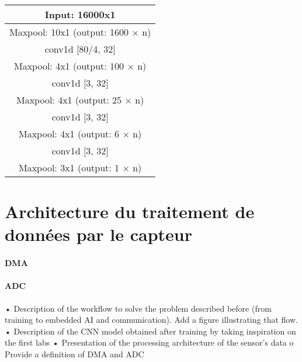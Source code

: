 \begin{center}
  \begin{tabular}{ |c|}
   \hline
    Input: 16000x1\\
   \hline
    Maxpool: 10x1 (output: 1600 × n)\\
   \hline
    conv1d [80/4, 32]\\
   \hline
    Maxpool: 4x1 (output: 100 × n)\\
   \hline
    conv1d [3, 32]\\
   \hline
    Maxpool: 4x1 (output: 25 × n)\\
   \hline
    conv1d [3, 32]\\
   \hline
    Maxpool: 4x1 (output: 6 × n)\\
   \hline
    conv1d [3, 32]\\
   \hline
    Maxpool: 3x1 (output: 1 × n)\\
   \hline
  \end{tabular}
\end{center}

\section{Architecture du traitement de données par le capteur}

\paragraph{DMA }
\paragraph{ADC }


• Description of the workflow to solve the problem described before (from training to
embedded AI and communication). Add a figure illustrating that flow.
• Description of the CNN model obtained after training by taking inspiration on the first labs
• Presentation of the processing architecture of the sensor’s data
o Provide a definition of DMA and ADC
